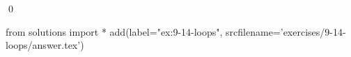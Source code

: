 
\begin{ex}
  \label{ex:9-14-loops}
  
  \qed
\end{ex}
\begin{python0}
from solutions import *
add(label="ex:9-14-loops",
    srcfilename='exercises/9-14-loops/answer.tex')
\end{python0}
